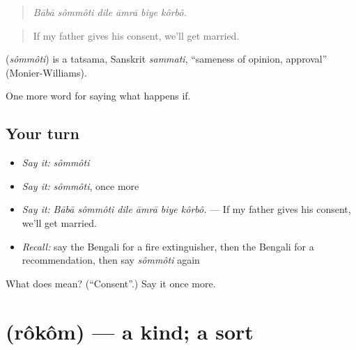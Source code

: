 \begin{quote}
     
\end{quote}

\begin{quote}
\emph{Bābā sômmôti dile āmrā biye kôrbô.}
\end{quote}

\begin{quote}
If my father gives his consent, we'll get married.
\end{quote}

\begin{cousinweb}
\textbf{} (\emph{sômmôti}) is a tatsama, Sanskrit \emph{sammati}, \textquotedblleft{}sameness of opinion, approval\textquotedblright{} (Monier-Williams).
\end{cousinweb}

\begin{grammarlens}[title={What you've built}]
One more word for saying what happens if.
\end{grammarlens}

\subsection*{Your turn}
\begin{itemize}
\raggedright
  \item \emph{Say it:} \emph{sômmôti}
  \item \emph{Say it:} \emph{sômmôti}, once more
  \item \emph{Say it:} \emph{Bābā sômmôti dile āmrā biye kôrbô.} — If my father gives his consent, we'll get married.
  \item \emph{Recall:} say the Bengali for a fire extinguisher, then the Bengali for a recommendation, then say \emph{sômmôti} again
\end{itemize}

\begin{tcolorbox}[breakable,colback=teal!4,colframe=teal!35!black,title={Before you move on}]
What does  mean? (\textquotedblleft{}Consent\textquotedblright{}.) Say it once more.
\end{tcolorbox}
\section[\texorpdfstring{\bn{রকম} (rôkôm)}{রকম (rôkôm)}]{ (rôkôm) — a kind; a sort}

\label{lesson:BN-C536-rokom}



